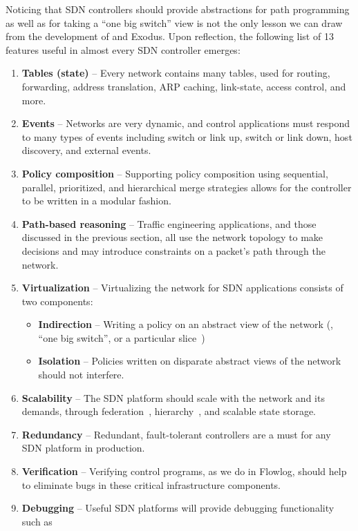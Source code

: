 Noticing that SDN controllers should provide abstractions for path programming as well as
for taking a ``one big switch'' view is not the only lesson we can draw from the development
of \sys and Exodus. Upon reflection, the following list of 13 features useful in almost every
SDN controller emerges:

\begin{enumerate}
\item {\bf Tables (state)} -- Every network contains many tables, used for routing, forwarding,
address translation, ARP caching, link-state, access control, and more.
\item {\bf Events} -- Networks are very dynamic, and control applications must respond to many
types of events including switch or link up, switch or link down, host discovery, and external events.
\item {\bf Policy composition} -- Supporting policy composition using sequential, parallel, prioritized,
and hierarchical merge strategies allows for the controller to be written in a modular fashion.
\item {\bf Path-based reasoning} -- Traffic engineering applications, and those discussed in the
previous section, all use the network topology to make decisions and may introduce constraints
on a packet's path through the network.
\item {\bf Virtualization} -- Virtualizing the network for SDN applications consists of two components:
	\begin{itemize}
	\item {\bf Indirection} -- Writing a policy on an abstract view of the network (\eg, ``one big switch'', or a particular slice~\cite{gutz:hotsdn12-slices})
	\item {\bf Isolation} -- Policies written on disparate abstract views of the network should not interfere.
	\end{itemize}
\item {\bf Scalability} -- The SDN platform should scale with the network and its demands, through
federation~\cite{Tootoonchian:2010}, hierarchy~\cite{kandoo,logical_xbars}, and scalable state storage.
\item {\bf Redundancy} -- Redundant, fault-tolerant controllers are a must for any SDN platform in production.
\item {\bf Verification} -- Verifying control programs, as we do in Flowlog, should help to eliminate
bugs in these critical infrastructure components.
\item {\bf Debugging} -- Useful SDN platforms will provide debugging functionality such as

\end{enumerate}
